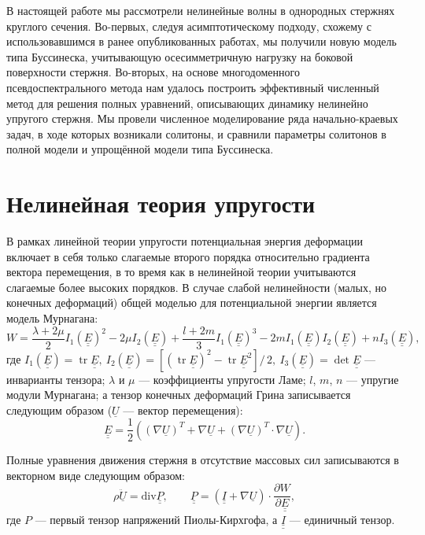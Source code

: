 \documentclass[12pt, a4paper]{article}
\DeclareMathOperator{\trace}{tr}
\newcommand{\lb}{\left (}
\newcommand{\rb}{\right )}
\newcommand{\lsq}{\left [}
\newcommand{\rsq}{\right ]}
\newcommand{\vect}[1]{\underline{#1}}
\newcommand{\tens}[1]{\underline{\underline{#1}}}
\newcommand{\divg}{\text{div}}
\newcommand{\pdiff}[2]{\frac{\partial #1}{\partial #2}}
\begin{document}
В настоящей работе мы рассмотрели нелинейные волны в однородных стержнях круглого сечения. Во-первых, следуя асимптотическому подходу, схожему с использовавшимся в ранее опубликованных работах, мы получили новую модель типа Буссинеска, учитывающую осесимметричную нагрузку на боковой поверхности стержня. Во-вторых, на основе многодоменного псевдоспектрального метода нам удалось построить эффективный численный метод для решения полных уравнений, описывающих динамику нелинейно упругого стержня. Мы провели численное моделирование ряда начально-краевых задач, в ходе которых возникали солитоны, и сравнили параметры солитонов в полной модели и упрощённой модели типа Буссинеска.

\section{Нелинейная теория упругости}
В рамках линейной теории упругости потенциальная энергия деформации включает в себя только слагаемые второго порядка относительно градиента вектора перемещения, в то время как в нелинейной теории учитываются слагаемые более высоких порядков. В случае слабой нелинейности (малых, но конечных деформаций) общей моделью для потенциальной энергии является модель Мурнагана:
\begin{equation}\label{murnaghan}
W = \frac{\lambda + 2\mu}{2}I_1(\tens{E})^2 - 2\mu I_2(\tens{E}) + \frac{l+2m}{3}I_1(\tens{E})^3 - 2m I_1(\tens{E}) I_2(\tens{E}) + n I_3(\tens{E}),
\end{equation}
где $I_1(\tens{E}) = \trace \tens{E},\  I_2(\tens{E}) = \lsq(\trace \tens{E})^2 - \trace \tens{E}^2\rsq/\,2,\ I_3(\tens{E}) = \det \tens{E}$ --- инварианты тензора; $\lambda$ и $\mu$ --- коэффициенты упругости Ламе; $l$, $m$, $n$ --- упругие модули Мурнагана; а тензор конечных деформаций Грина записывается следующим образом ($\vect{U}$ --- вектор перемещения):
\begin{equation}\label{1_strain}
\tens{E} = \frac12 \lb(\nabla\vect{U})^T + \nabla\vect{U} + (\nabla\vect{U})^T\cdot\nabla\vect{U}\rb.
\end{equation}

Полные уравнения движения стержня в отсутствие массовых сил записываются в векторном виде следующим образом:
\begin{equation}\label{full_eqns}
\rho\ddot{\vect{U}} = \divg\tens{P}, \qquad \tens{P} = (\tens{I} + \nabla\vect{U}) \cdot \pdiff{W}{\tens{E}},
\end{equation}
где $P$ --- первый тензор напряжений Пиолы-Кирхгофа, а $\tens{I}$ --- единичный тензор.
\end{document}
